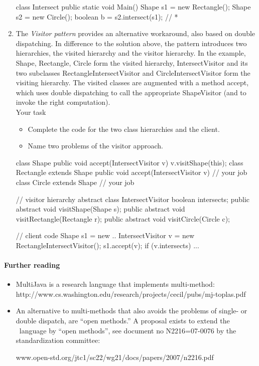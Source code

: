 \documentclass{article}
\begin{document}
\begin{enumerate}
\begin{java}
class Intersect {
   public static void Main() {
      Shape s1 = new Rectangle(); 
      Shape s2 = new Circle();
      boolean b = s2.intersect(s1);        // *
   }
}
\end{java}
\item The \textit{Visitor pattern} provides an alternative workaround,
also based on double dispatching. In difference
to the solution above, the pattern 
introduces two hierarchies, the visited
hierarchy and the visitor hierarchy. In the example,
 \textsf{Shape, Rectangle, Circle}
form the visited hierarchy, \textsf{IntersectVisitor} and its two
subclasses \textsf{RectangleIntersectVisitor} and \textsf{CircleIntersectVisitor}
form the visiting hierarchy. The visited classes are
augmented with a method \textsf{accept}, which uses double dispatching
to call the appropriate ShapeVisitor (and to invoke the
right computation). 
\\
Your task
\begin{itemize}
\item Complete the code for the two class hierarchies and the client.
\item Name two problems of the visitor approach.
\end{itemize}

\begin{java2}
class Shape {
    public void accept(IntersectVisitor v) {
	v.visitShape(this);
    }
}
class Rectangle extends Shape {
public  void accept(IntersectVisitor v) { 
        // your job
    }
}
class Circle extends Shape {
   // your job
}
 
// visitor hierarchy
abstract class IntersectVisitor { 
    boolean intersects; 
    public abstract void visitShape(Shape s);
    public abstract void visitRectangle(Rectangle r); 
    public abstract void visitCircle(Circle c); 
} 

// client code
  Shape s1 = new ..
  IntersectVisitor v = new RectangleIntersectVisitor();
  s1.accept(v);
  if (v.intersects) ...
\end{java2}
\end{enumerate}

\paragraph{Further reading}
\begin{itemize}
\item MultiJava is a research language that implements multi-method:\\
\textsf{http://www.cs.washington.edu/research/projects/cecil/pubs/mj-toplas.pdf}
\item An alternative to multi-methods that also avoids the problems of
single- or double dispatch, are ``open methods.'' A
 proposal exists to extend the \Cpp\ language by ``open methods'', see
document no N2216=07-0076 by the standardization committee:

\textsf{www.open-std.org/jtc1/sc22/wg21/docs/papers/2007/n2216.pdf}
\end{itemize}
\newpage
\end{document}

